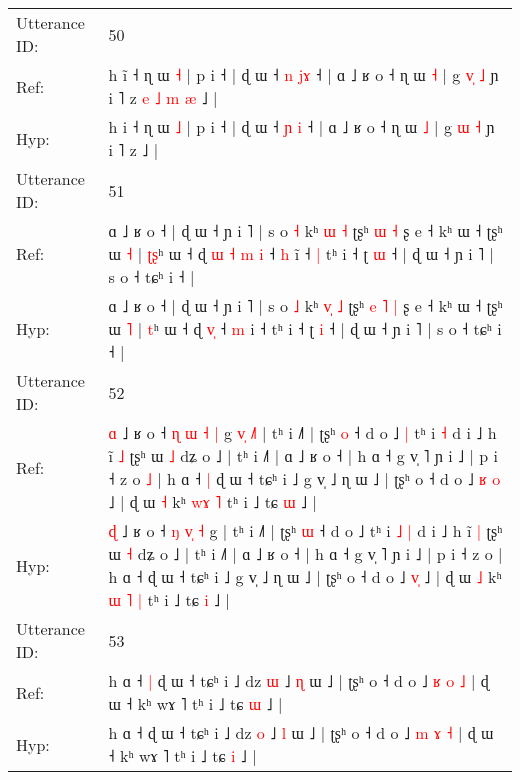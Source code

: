 \documentclass[10pt]{article}
\DeclareRobustCommand{\hl}[1]{{\textcolor{red}{#1}}}
\begin{document}
\begin{longtable}{ll}
 \\
\midrule
Utterance ID: & 50 \\
Ref: & h i\hl{̃} ˧ ɳ ɯ \hl{˧} | p i ˧ | ɖ ɯ ˧ \hl{n} \hl{j}\hl{ɤ} ˧ | ɑ ˩ ʁ o ˧ ɳ ɯ \hl{˧} | g \hl{v}\hl{̩} \hl{˩} ɲ i ˥ z\hl{ }\hl{e}\hl{ }\hl{˩}\hl{ }\hl{m}\hl{ }\hl{æ} ˩ |
 \\
Hyp: & h i\hl{} ˧ ɳ ɯ \hl{˩} | p i ˧ | ɖ ɯ ˧ \hl{ɲ} \hl{}\hl{i} ˧ | ɑ ˩ ʁ o ˧ ɳ ɯ \hl{˩} | g \hl{}\hl{ɯ} \hl{˧} ɲ i ˥ z\hl{}\hl{}\hl{}\hl{}\hl{}\hl{}\hl{}\hl{} ˩ |
 \\
\midrule
Utterance ID: & 51 \\
Ref: & ɑ ˩ ʁ o ˧ | ɖ ɯ ˧ ɲ i ˥ | s o \hl{˧} kʰ \hl{}\hl{ɯ} \hl{˧} ʈʂʰ\hl{}\hl{} \hl{ɯ} \hl{˧} ʂ e ˧ kʰ ɯ ˧ ʈʂʰ ɯ \hl{˧} | \hl{ʈ}\hl{ʂ}ʰ ɯ ˧ ɖ\hl{ }\hl{ɯ}\hl{ }\hl{˧} \hl{m}\hl{ }\hl{i} ˧ \hl{h} i\hl{̃} ˧\hl{ }\hl{|} tʰ i ˧ ʈ \hl{ɯ} ˧ | ɖ ɯ ˧ ɲ i ˥ | s o ˧ tɕʰ i ˧ |
 \\
Hyp: & ɑ ˩ ʁ o ˧ | ɖ ɯ ˧ ɲ i ˥ | s o \hl{˩} kʰ \hl{v}\hl{̩} \hl{˩} ʈʂʰ\hl{ }\hl{e} \hl{˥} \hl{|} ʂ e ˧ kʰ ɯ ˧ ʈʂʰ ɯ \hl{˥} | \hl{}\hl{t}ʰ ɯ ˧ ɖ\hl{}\hl{}\hl{}\hl{} \hl{}\hl{v}\hl{̩} ˧ \hl{m} i\hl{} ˧\hl{}\hl{} tʰ i ˧ ʈ \hl{i} ˧ | ɖ ɯ ˧ ɲ i ˥ | s o ˧ tɕʰ i ˧ |
 \\
\midrule
Utterance ID: & 52 \\
Ref: & \hl{ɑ} ˩ ʁ o ˧ \hl{ɳ} \hl{ɯ}\hl{ }\hl{˧} \hl{|} g\hl{ }\hl{v}\hl{̩}\hl{ }\hl{˩}\hl{˥} | tʰ i ˩˥ | ʈʂʰ \hl{o} ˧ d o ˩\hl{ }\hl{|} tʰ i\hl{}\hl{} \hl{˧} d i ˩ h ĩ \hl{˩} ʈʂʰ ɯ \hl{˩} dʑ o ˩ | tʰ i ˩˥ | ɑ ˩ ʁ o ˧ | h ɑ ˧ g v̩ ˥ ɲ i ˩ | p i ˧ z o\hl{ }\hl{˩} | h ɑ ˧\hl{ }\hl{|} ɖ ɯ ˧ tɕʰ i ˩ g v̩ ˩ ɳ ɯ ˩ | ʈʂʰ o ˧ d o ˩ \hl{ʁ}\hl{ }\hl{o} ˩ | ɖ ɯ \hl{˧} kʰ \hl{}\hl{w}\hl{ɤ} \hl{˥} tʰ i ˩ tɕ \hl{ɯ} ˩ |
 \\
Hyp: & \hl{ɖ} ˩ ʁ o ˧ \hl{ŋ} \hl{}\hl{v}\hl{̩} \hl{˧} g\hl{}\hl{}\hl{}\hl{}\hl{}\hl{} | tʰ i ˩˥ | ʈʂʰ \hl{ɯ} ˧ d o ˩\hl{}\hl{} tʰ i\hl{ }\hl{˩} \hl{|} d i ˩ h ĩ \hl{|} ʈʂʰ ɯ \hl{˧} dʑ o ˩ | tʰ i ˩˥ | ɑ ˩ ʁ o ˧ | h ɑ ˧ g v̩ ˥ ɲ i ˩ | p i ˧ z o\hl{}\hl{} | h ɑ ˧\hl{}\hl{} ɖ ɯ ˧ tɕʰ i ˩ g v̩ ˩ ɳ ɯ ˩ | ʈʂʰ o ˧ d o ˩ \hl{}\hl{v}\hl{̩} ˩ | ɖ ɯ \hl{˩} kʰ \hl{ɯ}\hl{ }\hl{˥} \hl{|} tʰ i ˩ tɕ \hl{i} ˩ |
 \\
\midrule
Utterance ID: & 53 \\
Ref: & h ɑ ˧\hl{ }\hl{|} ɖ ɯ ˧ tɕʰ i ˩ dz \hl{ɯ} ˩ \hl{ɳ} ɯ ˩ | ʈʂʰ o ˧ d o ˩ \hl{ʁ} \hl{o} \hl{˩} | ɖ ɯ ˧ kʰ wɤ ˥ tʰ i ˩ tɕ \hl{ɯ} ˩ |
 \\
Hyp: & h ɑ ˧\hl{}\hl{} ɖ ɯ ˧ tɕʰ i ˩ dz \hl{o} ˩ \hl{l} ɯ ˩ | ʈʂʰ o ˧ d o ˩ \hl{m} \hl{ɤ} \hl{˧} | ɖ ɯ ˧ kʰ wɤ ˥ tʰ i ˩ tɕ \hl{i} ˩ |
 \\

\end{longtable}
\end{document}
